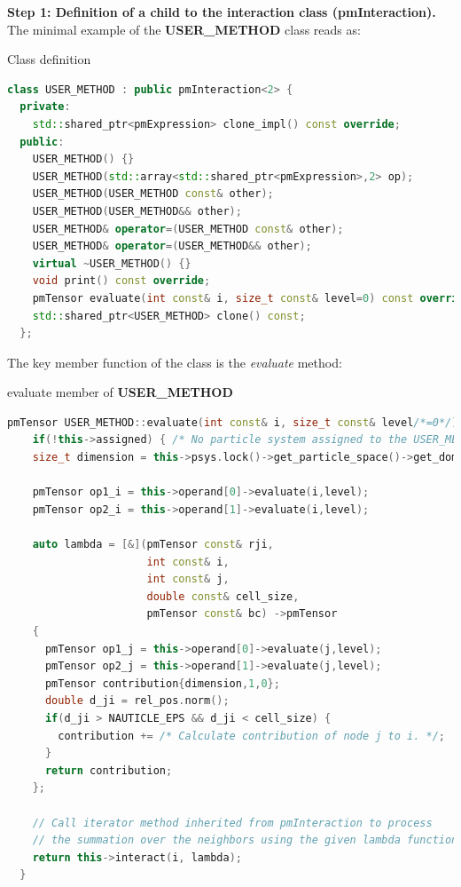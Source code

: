 \documentclass[a4paper,12pt,openany]{book}
\theoremstyle{break}
\begin{document}
\textbf{Step 1: Definition of a child to the interaction class (\textbf{pmInteraction}).} \\
The minimal example of the \textbf{USER\_METHOD} class reads as:
\begin{example}{Class definition}{}
\lstset{basicstyle=\tiny}
\begin{lstlisting}[language=c++]
  class USER_METHOD : public pmInteraction<2> {
  private:
    std::shared_ptr<pmExpression> clone_impl() const override;
  public:
    USER_METHOD() {}
    USER_METHOD(std::array<std::shared_ptr<pmExpression>,2> op);
    USER_METHOD(USER_METHOD const& other);
    USER_METHOD(USER_METHOD&& other);
    USER_METHOD& operator=(USER_METHOD const& other);
    USER_METHOD& operator=(USER_METHOD&& other);
    virtual ~USER_METHOD() {}
    void print() const override;
    pmTensor evaluate(int const& i, size_t const& level=0) const override;
    std::shared_ptr<USER_METHOD> clone() const;
  };
\end{lstlisting}
\end{example}
The key member function of the class is the \textit{evaluate} method:
\begin{example}{evaluate member of \textbf{USER\_METHOD}}{}
\lstset{basicstyle=\tiny}
\begin{lstlisting}[language=c++]
  pmTensor USER_METHOD::evaluate(int const& i, size_t const& level/*=0*/) const {
    if(!this->assigned) { /* No particle system assigned to the USER_METHOD interaction. */ }
    size_t dimension = this->psys.lock()->get_particle_space()->get_domain().get_dimensions();

    pmTensor op1_i = this->operand[0]->evaluate(i,level);
    pmTensor op2_i = this->operand[1]->evaluate(i,level);

    auto lambda = [&](pmTensor const& rji,
                      int const& i, 
                      int const& j, 
                      double const& cell_size, 
                      pmTensor const& bc) ->pmTensor
    {
      pmTensor op1_j = this->operand[0]->evaluate(j,level);
      pmTensor op2_j = this->operand[1]->evaluate(j,level);
      pmTensor contribution{dimension,1,0};
      double d_ji = rel_pos.norm();
      if(d_ji > NAUTICLE_EPS && d_ji < cell_size) {
        contribution += /* Calculate contribution of node j to i. */;
      }
      return contribution;
    };

    // Call iterator method inherited from pmInteraction to process 
    // the summation over the neighbors using the given lambda function.
    return this->interact(i, lambda);
  }
\end{lstlisting}
\end{example}
\end{document}
